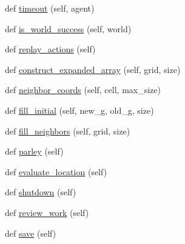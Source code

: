 \begin{DoxyCompactItemize}
\item 
def \hyperlink{classparlai_1_1mturk_1_1tasks_1_1talkthewalk_1_1worlds_1_1TalkTheWalkWorld_afd6fc4ead1a01da85a024a633e2232e3}{timeout} (self, agent)
\item 
def \hyperlink{classparlai_1_1mturk_1_1tasks_1_1talkthewalk_1_1worlds_1_1TalkTheWalkWorld_ae43f66ea3849c1b8015132e53d1a617b}{is\+\_\+world\+\_\+success} (self, world)
\item 
def \hyperlink{classparlai_1_1mturk_1_1tasks_1_1talkthewalk_1_1worlds_1_1TalkTheWalkWorld_a2d73f3c22c536a60d65166b3ebd55e75}{replay\+\_\+actions} (self)
\item 
def \hyperlink{classparlai_1_1mturk_1_1tasks_1_1talkthewalk_1_1worlds_1_1TalkTheWalkWorld_a563e21fcf5b38acb1db594a578fdf7f1}{construct\+\_\+expanded\+\_\+array} (self, grid, size)
\item 
def \hyperlink{classparlai_1_1mturk_1_1tasks_1_1talkthewalk_1_1worlds_1_1TalkTheWalkWorld_ae4bf42eec01e7f4d6e37fd2e9c55e4b0}{neighbor\+\_\+coords} (self, cell, max\+\_\+size)
\item 
def \hyperlink{classparlai_1_1mturk_1_1tasks_1_1talkthewalk_1_1worlds_1_1TalkTheWalkWorld_adcba21d8dd2fd552fc3c7c777e704397}{fill\+\_\+initial} (self, new\+\_\+g, old\+\_\+g, size)
\item 
def \hyperlink{classparlai_1_1mturk_1_1tasks_1_1talkthewalk_1_1worlds_1_1TalkTheWalkWorld_a44d5136e6f6808929e818041011d8e71}{fill\+\_\+neighbors} (self, grid, size)
\item 
def \hyperlink{classparlai_1_1mturk_1_1tasks_1_1talkthewalk_1_1worlds_1_1TalkTheWalkWorld_a9e6fdd57358e381a4b47163eb6176569}{parley} (self)
\item 
def \hyperlink{classparlai_1_1mturk_1_1tasks_1_1talkthewalk_1_1worlds_1_1TalkTheWalkWorld_a02bbcb1c7fb2301308620a9844427112}{evaluate\+\_\+location} (self)
\item 
def \hyperlink{classparlai_1_1mturk_1_1tasks_1_1talkthewalk_1_1worlds_1_1TalkTheWalkWorld_a123c230bcd187f7c8a223ea8d4a02927}{shutdown} (self)
\item 
def \hyperlink{classparlai_1_1mturk_1_1tasks_1_1talkthewalk_1_1worlds_1_1TalkTheWalkWorld_a0ef1913e867eaba5f24925ca3a8f1cda}{review\+\_\+work} (self)
\item 
def \hyperlink{classparlai_1_1mturk_1_1tasks_1_1talkthewalk_1_1worlds_1_1TalkTheWalkWorld_a7ae3bea4994385c3b1222dbab5e7f88f}{save} (self)
\end{DoxyCompactItemize}
